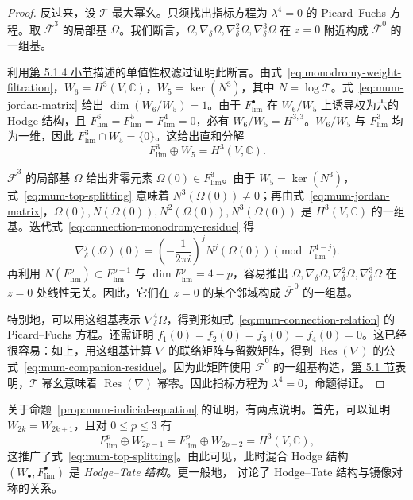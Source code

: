 \begin{proof}
反过来，设 $\mathcal T$ 最大幂幺。只须找出指标方程为 $\lambda^4=0$ 的 Picard--Fuchs 方程。取 $\overline{\mathcal F}^3$ 的局部基 $\Omega$。我们断言，$\Omega,\nabla_\delta\Omega,\nabla_\delta^2\Omega,\nabla_\delta^3\Omega$ 在 $z=0$ 附近构成 $\overline{\mathcal F}^0$ 的一组基。

利用\hyperref[subsec:limiting-hodge]{第 5.1.4 小节}描述的单值性权滤过证明此断言。由式~\eqref{eq:monodromy-weight-filtration}，$W_6=H^3(V,\mathbb C)$，$W_5=\ker(N^3)$，其中 $N=\log\mathcal T$。式~\eqref{eq:mum-jordan-matrix} 给出 $\dim(W_6/W_5)=1$。由于 $F_{\mathrm{lim}}^\bullet$ 在 $W_6/W_5$ 上诱导权为六的 Hodge 结构，且 $F_{\mathrm{lim}}^6=F_{\mathrm{lim}}^5=F_{\mathrm{lim}}^4=0$，必有 $W_6/W_5=H^{3,3}$。$W_6/W_5$ 与 $F_{\mathrm{lim}}^3$ 均为一维，因此 $F_{\mathrm{lim}}^3\cap W_5=\{0\}$。这给出直和分解
\begin{equation}\label{eq:mum-top-splitting}
F_{\mathrm{lim}}^3\oplus W_5=H^3(V,\mathbb C).
\end{equation}

$\overline{\mathcal F}^3$ 的局部基 $\Omega$ 给出非零元素 $\Omega(0)\in F_{\mathrm{lim}}^3$。由于 $W_5=\ker(N^3)$，式~\eqref{eq:mum-top-splitting} 意味着 $N^3(\Omega(0))\ne0$；再由式~\eqref{eq:mum-jordan-matrix}，$\Omega(0),N(\Omega(0)),N^2(\Omega(0)),N^3(\Omega(0))$ 是 $H^3(V,\mathbb C)$ 的一组基。迭代式~\eqref{eq:connection-monodromy-residue} 得
\[
\nabla_\delta^j(\Omega)(0)
=\left(-\frac1{2\pi i}\right)^jN^j(\Omega(0))
\pmod{F_{\mathrm{lim}}^{4-j}}.
\]
再利用 $N(F_{\mathrm{lim}}^p)\subset F_{\mathrm{lim}}^{p-1}$ 与 $\dim F_{\mathrm{lim}}^p=4-p$，容易推出 $\Omega,\nabla_\delta\Omega,\nabla_\delta^2\Omega,\nabla_\delta^3\Omega$ 在 $z=0$ 处线性无关。因此，它们在 $z=0$ 的某个邻域构成 $\overline{\mathcal F}^0$ 的一组基。

特别地，可以用这组基表示 $\nabla_\delta^4\Omega$，得到形如式~\eqref{eq:mum-connection-relation} 的 Picard--Fuchs 方程。还需证明 $f_1(0)=f_2(0)=f_3(0)=f_4(0)=0$。这已经很容易：如上，用这组基计算 $\nabla$ 的联络矩阵与留数矩阵，得到 $\operatorname{Res}(\nabla)$ 的公式~\eqref{eq:mum-companion-residue}。因为此矩阵使用 $\overline{\mathcal F}^0$ 的一组基构造，\hyperref[sec:hodge-theory]{第 5.1 节}表明，$\mathcal T$ 幂幺意味着 $\operatorname{Res}(\nabla)$ 幂零。因此指标方程为 $\lambda^4=0$，命题得证。
\end{proof}

关于命题~\ref{prop:mum-indicial-equation} 的证明，有两点说明。首先，可以证明 $W_{2k}=W_{2k+1}$，且对 $0\leq p\leq3$ 有
\begin{equation}\label{eq:mum-hodge-tate-splitting}
F_{\mathrm{lim}}^p\oplus W_{2p-1}
=F_{\mathrm{lim}}^p\oplus W_{2p-2}=H^3(V,\mathbb C),
\end{equation}
这推广了式~\eqref{eq:mum-top-splitting}。由此可见，此时混合 Hodge 结构 $(W_\bullet,F_{\mathrm{lim}}^\bullet)$ 是 \emph{Hodge--Tate 结构}。更一般地， 讨论了 Hodge--Tate 结构与镜像对称的关系。

